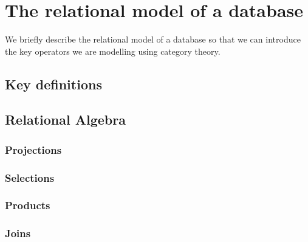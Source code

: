 \section{The relational model of a database}
We briefly describe the relational model of a database so that we can introduce the key operators we are modelling using category theory. 
\subsection{Key definitions}
\subsection{Relational Algebra}
\subsubsection{Projections}
\subsubsection{Selections}
\subsubsection{Products}
\subsubsection{Joins}
